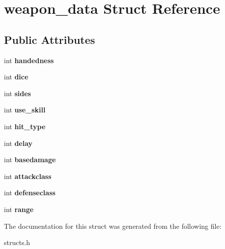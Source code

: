 \hypertarget{structweapon__data}{\section{weapon\-\_\-data Struct Reference}
\label{structweapon__data}
}
\subsection*{Public Attributes}
\begin{DoxyCompactItemize}
\item 
\hypertarget{structweapon__data_a97586bb9d2c71f5866d21367599806bb}{int {\bfseries handedness}}\label{structweapon__data_a97586bb9d2c71f5866d21367599806bb}

\item 
\hypertarget{structweapon__data_a9aff2202aa2b4c62d81ca16eb2d7d1a6}{int {\bfseries dice}}\label{structweapon__data_a9aff2202aa2b4c62d81ca16eb2d7d1a6}

\item 
\hypertarget{structweapon__data_acd4e98c25e656b4fdefafdc6cf3a0d07}{int {\bfseries sides}}\label{structweapon__data_acd4e98c25e656b4fdefafdc6cf3a0d07}

\item 
\hypertarget{structweapon__data_a019395a4df1780650c9e614853b54019}{int {\bfseries use\-\_\-skill}}\label{structweapon__data_a019395a4df1780650c9e614853b54019}

\item 
\hypertarget{structweapon__data_a7d6c5a161054ce406cfdee0dafbd4ed2}{int {\bfseries hit\-\_\-type}}\label{structweapon__data_a7d6c5a161054ce406cfdee0dafbd4ed2}

\item 
\hypertarget{structweapon__data_ab646699ef54c800842741b89f72b6280}{int {\bfseries delay}}\label{structweapon__data_ab646699ef54c800842741b89f72b6280}

\item 
\hypertarget{structweapon__data_a333138cf76af6771957bfff26075f126}{int {\bfseries basedamage}}\label{structweapon__data_a333138cf76af6771957bfff26075f126}

\item 
\hypertarget{structweapon__data_acdadb390593000d5561a33bd839125ef}{int {\bfseries attackclass}}\label{structweapon__data_acdadb390593000d5561a33bd839125ef}

\item 
\hypertarget{structweapon__data_aea968a5cc4ec4dc3d554ef789e58da69}{int {\bfseries defenseclass}}\label{structweapon__data_aea968a5cc4ec4dc3d554ef789e58da69}

\item 
\hypertarget{structweapon__data_a4d697901007c5cd0f604b59a5864809d}{int {\bfseries range}}\label{structweapon__data_a4d697901007c5cd0f604b59a5864809d}

\end{DoxyCompactItemize}


The documentation for this struct was generated from the following file\-:\begin{DoxyCompactItemize}
\item 
structs.\-h\end{DoxyCompactItemize}
